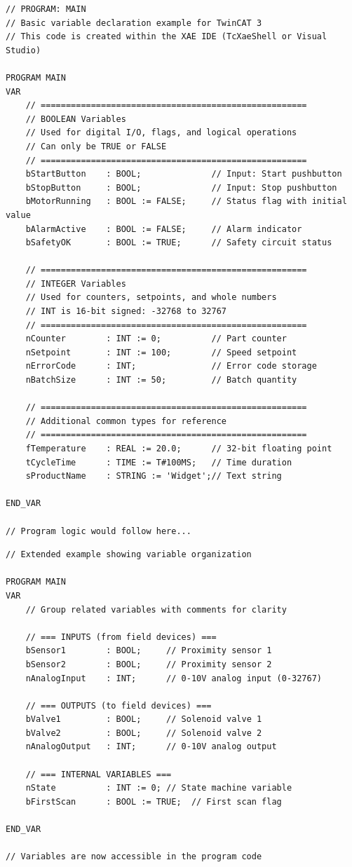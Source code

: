 \documentclass[11pt,a4paper]{article}
\begin{document}
\begin{lstlisting}
// PROGRAM: MAIN
// Basic variable declaration example for TwinCAT 3
// This code is created within the XAE IDE (TcXaeShell or Visual Studio)

PROGRAM MAIN
VAR
    // =====================================================
    // BOOLEAN Variables
    // Used for digital I/O, flags, and logical operations
    // Can only be TRUE or FALSE
    // =====================================================
    bStartButton    : BOOL;              // Input: Start pushbutton
    bStopButton     : BOOL;              // Input: Stop pushbutton
    bMotorRunning   : BOOL := FALSE;     // Status flag with initial value
    bAlarmActive    : BOOL := FALSE;     // Alarm indicator
    bSafetyOK       : BOOL := TRUE;      // Safety circuit status
    
    // =====================================================
    // INTEGER Variables
    // Used for counters, setpoints, and whole numbers
    // INT is 16-bit signed: -32768 to 32767
    // =====================================================
    nCounter        : INT := 0;          // Part counter
    nSetpoint       : INT := 100;        // Speed setpoint
    nErrorCode      : INT;               // Error code storage
    nBatchSize      : INT := 50;         // Batch quantity
    
    // =====================================================
    // Additional common types for reference
    // =====================================================
    fTemperature    : REAL := 20.0;      // 32-bit floating point
    tCycleTime      : TIME := T#100MS;   // Time duration
    sProductName    : STRING := 'Widget';// Text string
    
END_VAR

// Program logic would follow here...
\end{lstlisting}

\begin{lstlisting}
// Extended example showing variable organization

PROGRAM MAIN
VAR
    // Group related variables with comments for clarity
    
    // === INPUTS (from field devices) ===
    bSensor1        : BOOL;     // Proximity sensor 1
    bSensor2        : BOOL;     // Proximity sensor 2
    nAnalogInput    : INT;      // 0-10V analog input (0-32767)
    
    // === OUTPUTS (to field devices) ===
    bValve1         : BOOL;     // Solenoid valve 1
    bValve2         : BOOL;     // Solenoid valve 2
    nAnalogOutput   : INT;      // 0-10V analog output
    
    // === INTERNAL VARIABLES ===
    nState          : INT := 0; // State machine variable
    bFirstScan      : BOOL := TRUE;  // First scan flag
    
END_VAR

// Variables are now accessible in the program code
\end{lstlisting}
\end{document}
